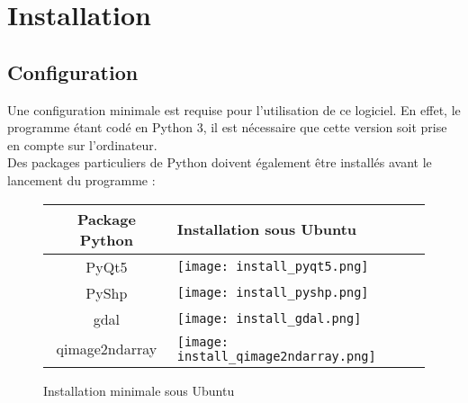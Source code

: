 \chapter[Installation]{Installation}

\section{Configuration}

Une configuration minimale est requise pour l'utilisation de ce logiciel. En effet, le programme étant codé en Python 3, il est nécessaire que cette version soit prise en compte sur l'ordinateur. \\

Des packages particuliers de Python doivent également être installés avant le lancement du programme :

\renewcommand{\arraystretch}{1.7}
\begin{figure}[H]
	\begin{center}
		\begin{tabular}{|c|m{}|}
			\hline
			Package Python & Installation sous Ubuntu \\
			\hline
			PyQt5 & \texttt{[image: install\_pyqt5.png]}  \\
			PyShp & \texttt{[image: install\_pyshp.png]} \\
			gdal & \texttt{[image: install\_gdal.png]} \\
			qimage2ndarray & \texttt{[image: install\_qimage2ndarray.png]} \\
			\hline
		\end{tabular}
	\end{center}
	\caption[Installation minimale sous Ubuntu]{Installation minimale sous Ubuntu}
	\label{tab:installubuntu}
\end{figure}

